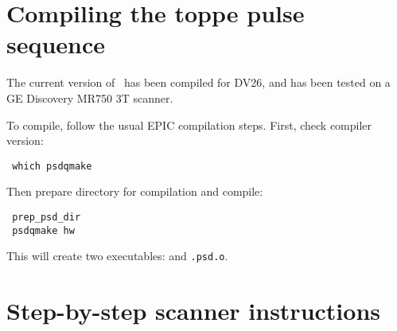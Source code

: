 \section{Compiling the toppe pulse sequence}

The current version of \toppe~has been compiled for DV26, and has been tested on a GE Discovery MR750 3T scanner.

To compile, follow the usual EPIC compilation steps.
First, check compiler version:
\vspace{-10pt}
\begin{lstlisting}
 which psdqmake
\end{lstlisting}

Then prepare directory for compilation and compile:
\vspace{-10pt}
\begin{lstlisting}
 prep_psd_dir
 psdqmake hw
\end{lstlisting}
This will create two executables: {\tt \psdname} and {\tt \psdname.psd.o}.




\section{Step-by-step scanner instructions}

